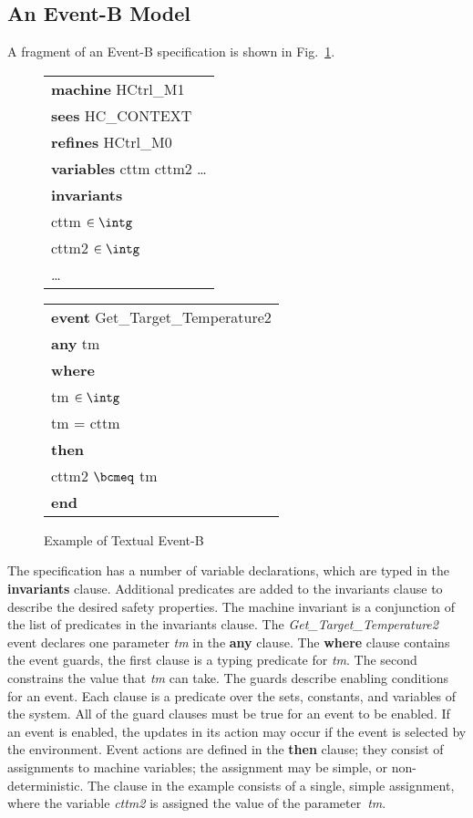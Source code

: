 \subsection{An Event-B Model}
A fragment of an Event-B specification is shown in Fig.~\ref{fig:TextualEventB}.
%
\begin{figure}
\begin{sffamily}
\begin{minipage}{0.5\linewidth}
\begin{tabular}{l}
\textbf{machine} HCtrl\_M1 \\
\textbf{sees} HC\_CONTEXT  \\
\textbf{refines} HCtrl\_M0  \\
\textbf{variables}  cttm cttm2 \ldots \\
\textbf{invariants}\\
\quad  cttm $\in \intg$\\ 
\quad  cttm2 $\in \intg$\\
\qquad  \ldots
\end{tabular}
\end{minipage}
\begin{minipage}{0.5\linewidth}
\begin{tabular}{l}
\quad\textbf{event} Get\_Target\_Temperature2\\
\quad\textbf{any} tm\\
\quad\textbf{where}\\
\qquad  tm $\in \intg$\\ 
\qquad tm = cttm\\
\quad\textbf{then}\\
\qquad cttm2 $\bcmeq$ tm\\
 \quad \textbf{end}
\end{tabular}
\end{minipage}
\end{sffamily}
	\caption{Example of Textual Event-B}
	\label{fig:TextualEventB}
\end{figure}
%
The specification has a number of variable declarations, which are typed in the \textbf{invariants} clause. Additional predicates are added to the invariants clause to describe the desired safety properties. The machine invariant is a conjunction of the list of predicates in the invariants clause. The \emph{Get\_Target\_Temperature2} event declares one parameter \emph{tm} in the \textbf{any} clause. The \textbf{where} clause contains the event guards, the first clause is a typing predicate for \emph{tm}. The second constrains the value that \emph{tm} can take. The guards describe enabling conditions for an event. Each clause is a predicate over the sets, constants, and variables of the system. All of the guard clauses must be true for an event to be enabled. If an event is enabled, the updates in its action may occur if the event is selected by the environment. Event actions are defined in the \textbf{then} clause; they consist of assignments to machine variables; the assignment may be simple, or non-deterministic. The clause in the example consists of a single, simple assignment, where the variable \emph{cttm2} is assigned the value of the parameter~\emph{tm}.  
